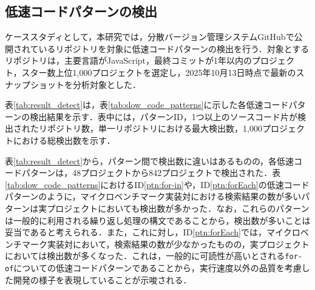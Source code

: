 \documentclass[submit,techrep,noauthor]{ipsj}
\begin{document}
\subsection{低速コードパターンの検出}

ケーススタディとして，本研究では，分散バージョン管理システムGitHubで公開されているリポジトリを対象に低速コードパターンの検出を行う．対象とするリポジトリは，主要言語がJavaScript，最終コミットが1年以内のプロジェクト，スター数上位1,000プロジェクトを選定し，2025年10月13日時点で最新のスナップショットを分析対象とした．

表\ref{tab:result_detect}は，表\ref{tab:slow_code_patterns}に示した各低速コードパターンの検出結果を示す．表中には，パターンID，1つ以上のソースコード片が検出されたリポジトリ数，単一リポジトリにおける最大検出数，1,000プロジェクトにおける総検出数を示す．

表\ref{tab:result_detect}から，パターン間で検出数に違いはあるものの，各低速コードパターンは，48プロジェクトから842プロジェクトで検出された．表\ref{tab:slow_code_patterns}におけるID\ref{ptn:for-in}や，ID\ref{ptn:forEach}の低速コードパターンのように，マイクロベンチマーク実装対における検索結果の数が多いパターンは実プロジェクトにおいても検出数が多かった．なお，これらのパターンは一般的に利用される繰り返し処理の構文であることから，検出数が多いことは妥当であると考えられる．また，これに対し，ID\ref{ptn:forEach}では，マイクロベンチマーク実装対において，検索結果の数が少なかったものの，実プロジェクトにおいては検出数が多くなった．これは，一般的に可読性が高いとされる\texttt{for-of}についての低速コードパターンであることから，実行速度以外の品質を考慮した開発の様子を表現していることが示唆される．

\begin{table}[t]
    \centering
    \caption{低速コードパターンに基づく検出結果}
    \label{tab:result_detect}
\end{table}
\end{document}
